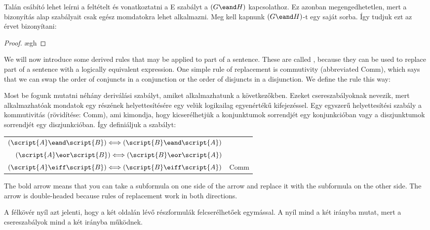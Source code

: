 Talán csábító lehet leírni a feltételt és vonatkoztatni a {\eand}E szabályt a $(G \eand H)$ kapcsolathoz. Ez azonban megengedhetetlen, mert a bizonyítás alap szabályait csak egész momdatokra lehet alkalmazni. Meg kell kapnunk $(G \eand H)$-t egy saját sorba. Így tudjuk ezt az érvet bizonyítani:



\begin{proof}
	\open
		\ae{gh}
	\close
\end{proof}

We will now introduce some derived rules that may be applied to part of a sentence. These are called , because they can be used to replace part of a sentence with a logically equivalent expression. One simple rule of replacement is commutivity (abbreviated Comm), which says that we can swap the order of conjuncts in a conjunction or the order of disjuncts in a disjunction. We define the rule this way:

Most be fogunk mutatni néhány deriválási szabályt, amiket alkalmazhatunk a következőkben. Ezeket csereszabályoknak nevezik, mert alkalmazhatóak mondatok egy részének helyettesítésére egy velük logikailag egyenértékű kifejezéssel. Egy egyszerű helyettesítési szabály a kommutivitás (rövidítése: Comm), ami kimondja, hogy kicserélhetjük a konjunktumok sorrendjét egy konjunkcióban vagy a diszjunktumok sorrendjét egy diszjunkcióban.  Így definiáljuk a szabályt:

\begin{center}
\begin{tabular}{rl}
$(\script{A}\eand\script{B}) \Longleftrightarrow (\script{B}\eand\script{A})$\\
$(\script{A}\eor\script{B}) \Longleftrightarrow (\script{B}\eor\script{A})$\\
$(\script{A}\eiff\script{B}) \Longleftrightarrow (\script{B}\eiff\script{A})$
& Comm
\end{tabular}
\end{center}

The bold arrow means that you can take a subformula on one side of the arrow and replace it with the subformula on the other side. The arrow is double-headed because rules of replacement work in both directions.

A félkövér nyíl azt jelenti, hogy a két oldalán lévő részformulák felcserélhetőek egymással. A nyíl mind a két irányba mutat, mert a csereszabályok mind a két irányba működnek. 

